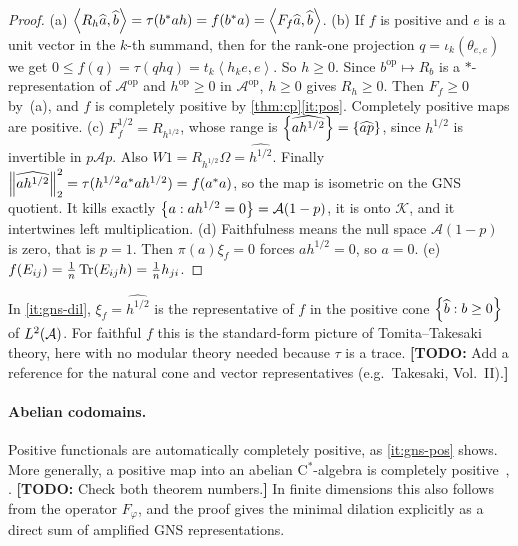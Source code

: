 \documentclass[12pt]{article}
\newcommand{\todo}[1]{\textcolor{\mysubcolor}{\small\textbf{[TODO:} #1\textbf{]}}}
\newcommand{\alg}{\mathcal{A}}             %
\newcommand{\dil}{\mathcal{K}}             %
\newcommand{\op}{^{\mathrm{op}}}           %
\newcommand{\ip}[2]{\left\langle #1 , #2 \right\rangle}
\newcommand{\rankone}[2]{\theta_{#1, #2}}  %
\newcommand{\Ltwo}{L^2\br{\alg}}
\newcommand{\vect}[1]{\widehat{#1}}
\newcommand{\Fphi}{F_{\varphi}}
\begin{document}
\begin{proof}
(a) \(\ip{R_h\vect a}{\vect b} = \tau(b^\adjoint ah) = f(b^\adjoint a)
= \ip{F_f\vect a}{\vect b}\).
(b) If \(f\) is positive and \(e\) is a unit vector in the \(k\)-th summand, then
for the rank-one projection \(q = \iota_k(\rankone ee)\) we get
\(0 \le f(q) = \tau(qhq) = t_k\ip{h_ke}{e}\). So \(h \ge 0\). Since
\(b\op \mapsto R_b\) is a \(*\)-representation of \(\alg\op\) and \(h\op \ge 0\) in
\(\alg\op\), \(h \ge 0\) gives \(R_h \ge 0\). Then \(F_f \ge 0\) by~(a), and
\(f\) is completely positive by \cref{thm:cp}\ref{it:pos}. Completely positive
maps are positive.
(c) \(F_f^{1/2} = R_{h^{1/2}}\), whose range is
\(\set{\vect{ah^{1/2}}} = \set{\vect{ap}}\), since \(h^{1/2}\) is invertible in
\(p\alg p\). Also \(W1 = R_{h^{1/2}}\Omega = \vect{h^{1/2}}\). Finally
\(\norm{\vect{ah^{1/2}}}_2^2 = \tau(h^{1/2}a^\adjoint ah^{1/2}) = f(a^\adjoint a)\),
so the map is isometric on the GNS quotient. It kills exactly
\(\set{a : ah^{1/2} = 0} = \alg(1-p)\), it is onto \(\dil\), and it intertwines
left multiplication.
(d) Faithfulness means the null space \(\alg(1-p)\) is zero, that is \(p = 1\).
Then \(\pi(a)\xi_f = 0\) forces \(ah^{1/2} = 0\), so \(a = 0\).
(e) \(f(E_{ij}) = \frac1n\operatorname{Tr}(E_{ij}h) = \frac1n h_{ji}\).
\end{proof}

\begin{remark}
In \ref{it:gns-dil}, \(\xi_f = \vect{h^{1/2}}\) is the representative of \(f\) in
the positive cone \(\set{\vect b : b \ge 0}\) of \(\Ltwo\). For faithful \(f\)
this is the standard-form picture of Tomita--Takesaki theory, here with no
modular theory needed because \(\tau\) is a trace. \todo{Add a reference for the
natural cone and vector representatives (e.g.\ Takesaki, Vol.~II).}
\end{remark}

\paragraph{Abelian codomains.}
Positive functionals are automatically completely positive, as
\ref{it:gns-pos} shows. More generally, a positive map into an abelian
C\(^*\)-algebra is completely positive~\cite[Theorem~4]{Stinespring1955},
\cite[Theorem~3.9]{Paulsen2002}. \todo{Check both theorem numbers.} In finite
dimensions this also follows from the operator \(\Fphi\), and the proof gives
the minimal dilation explicitly as a direct sum of amplified GNS
representations.
\end{document}
